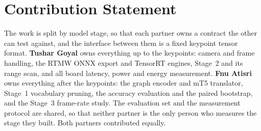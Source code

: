 \documentclass[conference]{IEEEtran}
\begin{document}
\section*{Contribution Statement}\label{contribstart}

The work is split by model stage, so that each partner owns a contract the other can test
against, and the interface between them is a fixed keypoint tensor format.
\textbf{Tushar Goyal} owns everything up to the keypoints: camera and frame
handling, the RTMW ONNX export and TensorRT engines, Stage~2 and its range scan, and all
board latency, power and energy measurement. \textbf{Fnu Atisri} owns everything after the
keypoints: the graph encoder and mT5 translator, Stage~1 vocabulary pruning, the accuracy
evaluation and the paired bootstrap, and the Stage~3 frame-rate study. The evaluation set
and the measurement protocol are shared, so that neither partner is the only person who
measures the stage they built. Both partners contributed equally.
\end{document}
